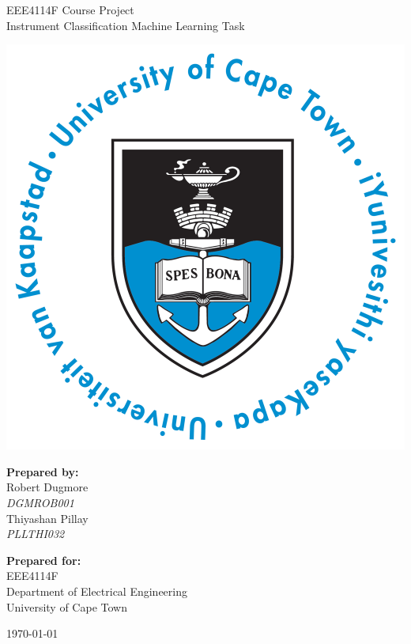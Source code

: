 \thispagestyle{empty}
\begin{center}
    
\Huge

\vspace{5cm}

EEE4114F Course Project\\Instrument Classification Machine Learning Task

\vspace{2.5cm}

\includegraphics[width=0.4\linewidth]{FrontMatter/UCT_logo.png}

\vfill

\large
\textbf{Prepared by:}\\
Robert Dugmore \\
\textit{DGMROB001} \\
Thiyashan Pillay \\
\textit{PLLTHI032} \\

\vspace{1cm}

\textbf{Prepared for:}\\
EEE4114F\\
Department of Electrical Engineering\\
University of Cape Town

\vspace{2cm}

\today


\end{center}

\newpage